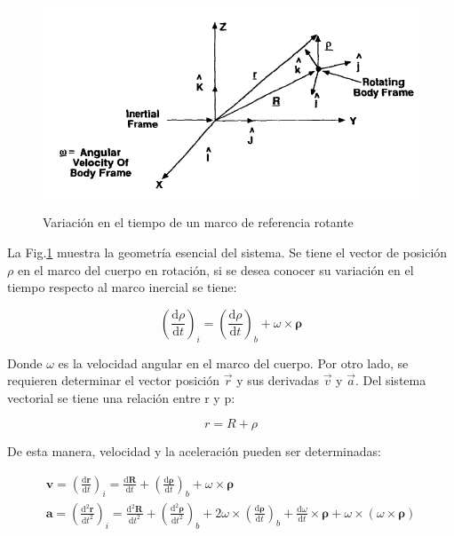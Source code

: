 \begin{figure}[!h]
	\begin{center}
		\includegraphics[scale=0.6]{imagenes/modelo_dinamico/ref_system.PNG}\\
	\end{center}
	\caption{Variación en el tiempo de un marco de referencia rotante}
	\label{fig:rot_frame}
	\textit{}
\end{figure}

La Fig.\ref{fig:rot_frame} muestra la geometría esencial del sistema. Se tiene el vector de posición $\rho$ en el marco del cuerpo en rotación, si se desea conocer su variación en el tiempo respecto al marco inercial se tiene:

\begin{equation}\label{eq:variacion_rho}
	\left(\frac{\mathrm{d} \rho}{\mathrm{d} t}\right)_i=\left(\frac{\mathrm{d} \rho}{\mathrm{d} t}\right)_b+\omega \times \boldsymbol{\rho}
\end{equation}

Donde $\omega$ es la velocidad angular en el marco del cuerpo. Por otro lado, se requieren determinar el vector posición $\vec{r}$ y sus derivadas $\vec{v}$ y $\vec{a}$. Del sistema vectorial se tiene una relación entre r y p:

\begin{equation}\label{eq:suma_vectores}
	r = R + \rho
\end{equation}

De esta manera, velocidad y la aceleración pueden ser determinadas: 

\begin{gather}
		\boldsymbol{v}=\left(\frac{\mathrm{d} \boldsymbol{r}}{\mathrm{d} t}\right)_i=\frac{\mathrm{d} \boldsymbol{R}}{\mathrm{d} t}+\left(\frac{\mathrm{d} \boldsymbol{\rho}}{\mathrm{d} t}\right)_b+\omega \times \boldsymbol{\rho}\label{eq:velocidad}\\[10pt]			
		\boldsymbol{a}=\left(\frac{\mathrm{d}^2 \boldsymbol{r}}{\mathrm{d} t^2}\right)_i=\frac{\mathrm{d}^2 \boldsymbol{R}}{\mathrm{d} t^2}+\left(\frac{\mathrm{d}^2 \boldsymbol{\rho}}{\mathrm{d} t^2}\right)_b+2 \omega \times\left(\frac{\mathrm{d} \boldsymbol{\rho}}{\mathrm{d} t}\right)_b+\frac{\mathrm{d} \omega}{\mathrm{d} t} \times \boldsymbol{\rho}+\omega \times(\omega \times \boldsymbol{\rho})\label{eq:aceleracion}				
\end{gather}

